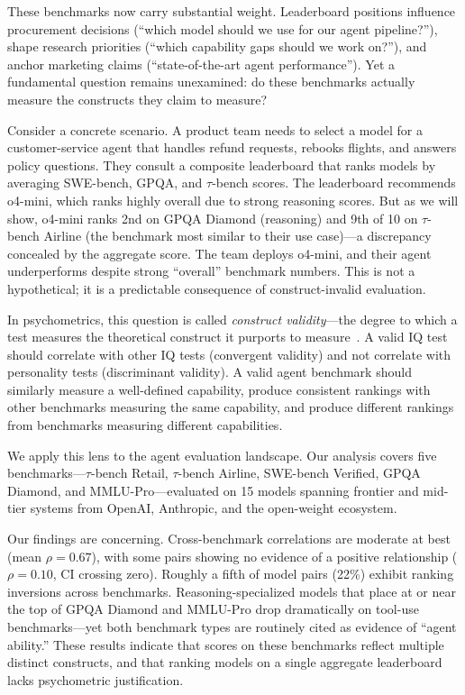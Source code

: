 \documentclass[11pt]{article}
\begin{document}
These benchmarks now carry substantial weight. Leaderboard positions influence procurement decisions (``which model should we use for our agent pipeline?''), shape research priorities (``which capability gaps should we work on?''), and anchor marketing claims (``state-of-the-art agent performance''). Yet a fundamental question remains unexamined: do these benchmarks actually measure the constructs they claim to measure?

Consider a concrete scenario. A product team needs to select a model for a customer-service agent that handles refund requests, rebooks flights, and answers policy questions. They consult a composite leaderboard that ranks models by averaging SWE-bench, GPQA, and $\tau$-bench scores. The leaderboard recommends o4-mini, which ranks highly overall due to strong reasoning scores. But as we will show, o4-mini ranks 2nd on GPQA Diamond (reasoning) and 9th of 10 on $\tau$-bench Airline (the benchmark most similar to their use case)---a discrepancy concealed by the aggregate score. The team deploys o4-mini, and their agent underperforms despite strong ``overall'' benchmark numbers. This is not a hypothetical; it is a predictable consequence of construct-invalid evaluation.

In psychometrics, this question is called \emph{construct validity}---the degree to which a test measures the theoretical construct it purports to measure~\cite{cronbach1955construct}. A valid IQ test should correlate with other IQ tests (convergent validity) and not correlate with personality tests (discriminant validity). A valid agent benchmark should similarly measure a well-defined capability, produce consistent rankings with other benchmarks measuring the same capability, and produce different rankings from benchmarks measuring different capabilities.

We apply this lens to the agent evaluation landscape. Our analysis covers five benchmarks---$\tau$-bench Retail, $\tau$-bench Airline, SWE-bench Verified, GPQA Diamond, and MMLU-Pro---evaluated on 15 models spanning frontier and mid-tier systems from OpenAI, Anthropic, and the open-weight ecosystem.

Our findings are concerning. Cross-benchmark correlations are moderate at best (mean $\rho = 0.67$), with some pairs showing no evidence of a positive relationship ($\rho = 0.10$, CI crossing zero). Roughly a fifth of model pairs (22\%) exhibit ranking inversions across benchmarks. Reasoning-specialized models that place at or near the top of GPQA Diamond and MMLU-Pro drop dramatically on tool-use benchmarks---yet both benchmark types are routinely cited as evidence of ``agent ability.'' These results indicate that scores on these benchmarks reflect multiple distinct constructs, and that ranking models on a single aggregate leaderboard lacks psychometric justification.
\end{document}
